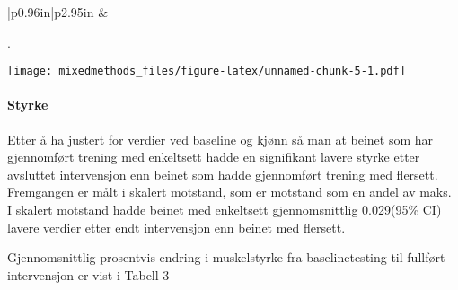 \documentclass[
]{article}
\begin{document}
\begin{longtable}[c]{|p{0.96in}|p{2.95in}}
 &  \\

\noalign{\global\setlength{\arrayrulewidth}{2pt}}



\end{longtable}

.

\texttt{[image: mixedmethods\_files/figure-latex/unnamed-chunk-5-1.pdf]}

\hypertarget{styrke}{%
\paragraph{Styrke}\label{styrke}}

Etter å ha justert for verdier ved baseline og kjønn så man at beinet
som har gjennomført trening med enkeltsett hadde en signifikant lavere
styrke etter avsluttet intervensjon enn beinet som hadde gjennomført
trening med flersett. Fremgangen er målt i skalert motstand, som er
motstand som en andel av maks. I skalert motstand hadde beinet med
enkeltsett gjennomsnittlig 0.029(95\% CI) lavere verdier etter endt
intervensjon enn beinet med flersett.

Gjennomsnittlig prosentvis endring i muskelstyrke fra baselinetesting
til fullført intervensjon er vist i Tabell 3

\providecommand{\docline}[3]{\noalign{\global\setlength{\arrayrulewidth}{#1}}\arrayrulecolor[HTML]{#2}\cline{#3}}

\setlength{\tabcolsep}{2pt}

\renewcommand*{\arraystretch}{1.5}
\end{document}
